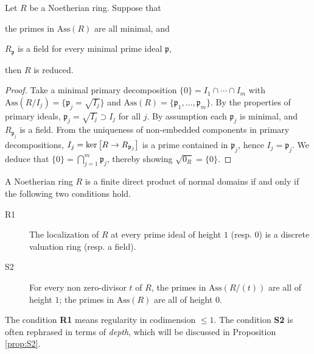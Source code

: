 \begin{lemma}\label{prop:reduced-test}
	Let $R$ be a Noetherian ring. Suppose that
	\begin{compactitem}
		\item the primes in $\text{Ass}(R)$ are all minimal, and
		\item $R_{\mathfrak{p}}$ is a field for every minimal prime ideal $\mathfrak{p}$,
	\end{compactitem}
	then $R$ is reduced.
\end{lemma}
\begin{proof}
	Take a minimal primary decomposition $\{0\} = I_1 \cap \cdots \cap I_m$ with $\text{Ass}(R/I_j) = \{\mathfrak{p}_j = \sqrt{I_j} \}$ and $\text{Ass}(R) = \{\mathfrak{p}_1, \ldots, \mathfrak{p}_m \}$. By the properties of primary ideals, $\mathfrak{p}_j = \sqrt{I_j} \supset I_j$ for all $j$. By assumption each $\mathfrak{p}_j$ is minimal, and $R_{\mathfrak{p}_j}$ is a field. From the uniqueness of non-embedded components in primary decompositions, $I_j = \operatorname{ker}\left[R \to R_{\mathfrak{p}_j}\right]$ is a prime contained in $\mathfrak{p}_j$, hence $I_j = \mathfrak{p}_j$. We deduce that $\{0\} = \bigcap_{j=1}^m \mathfrak{p}_j$, thereby showing $\sqrt{0_R} = \{0\}$.
\end{proof}

\begin{theorem}[J.-P. Serre]\label{prop:Serre-criterion}
	A Noetherian ring $R$ is a finite direct product of normal domains if and only if the following two conditions hold.
	\begin{description}
		\item[R1] The localization of $R$ at every prime ideal of height $1$ (resp. $0$) is a discrete valuation ring (resp. a field).
		\item[S2] For every non zero-divisor $t$ of $R$, the primes in $\text{Ass}(R/(t))$ are all of height $1$; the primes in $\text{Ass}(R)$ are all of height $0$.
	\end{description}
\end{theorem}
The condition \textbf{R1} means regularity in codimension $\leq 1$. The condition \textbf{S2} is often rephrased in terms of \emph{depth}, which will be discussed in Proposition \ref{prop:S2}.

